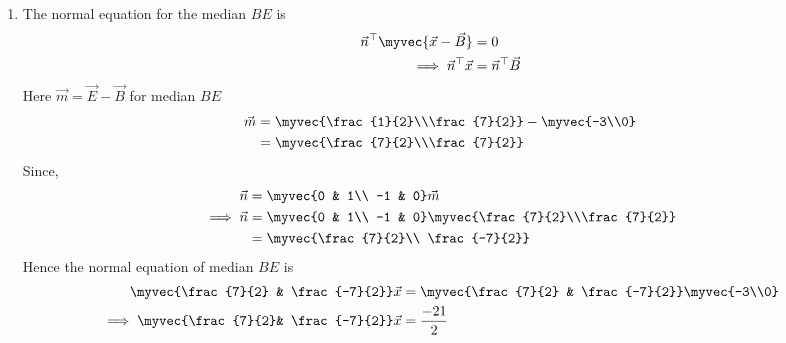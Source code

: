 \documentclass[11pt]{book}
\begin{document}
\begin{enumerate}[label=\thesection.\arabic*.,ref=\thesection.\theenumi]
\begin{enumerate}
\item The normal equation for the median $BE$ is
\begin{align}
\vec{n}^{\top}\myvec{\vec{x}-\vec{B}}&=0\\
\implies
\vec{n}^{\top}\vec{x}&=\vec{n}^{\top}\vec{B}
\end{align}
Here $\vec{m} = \vec{E}- \vec{B}$ for median $BE$
\begin{align}
\vec{m}&=\myvec{\frac{1}{2}\\\frac{7}{2}} - \myvec{-3\\0}\\
       &=\myvec{\frac{7}{2}\\\frac{7}{2}}
\end{align}
Since,
\begin{align}
  \vec{n} &= \myvec{0 & 1\\
  -1 & 0}\vec{m}\\
\implies
\vec{n} &= \myvec{0 & 1\\
  -1 & 0}\myvec{\frac{7}{2}\\\frac{7}{2}}\\
        &= \myvec{\frac{7}{2}\\ \frac{-7}{2}}
\end{align}
Hence the normal equation of median $BE$ is 
\begin{align}
    \myvec{\frac{7}{2} & \frac{-7}{2}}\vec{x}&=\myvec{\frac{7}{2} & \frac{-7}{2}}\myvec{-3\\0}\\
\implies
    \myvec{\frac{7}{2}& \frac{-7}{2}}\vec{x}&=\frac{-21}{2}
\end{align}


\end{enumerate}
\end{enumerate}
\end{document}
